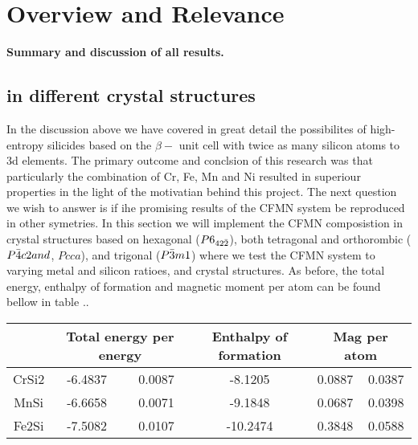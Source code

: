 \chapter{Overview and Relevance}
\label{sec:overview}

\textbf{Summary and discussion of all results.}

\section{ in different crystal structures}

In the discussion above we have covered in great detail the possibilites of high-entropy silicides based on the $\beta-$  unit cell with twice as many silicon atoms to 3d elements. The primary outcome and conclsion of this research was that particularly the combination of Cr, Fe, Mn and Ni resulted in superiour properties in the light of the motivatian behind this project. The next question we wish to answer is if ihe promising results of the CFMN system be reproduced in other symetries. In this section we will implement the CFMN composistion in crystal structures based on hexagonal  ($P6_{42\Bar{2}}$), both tetragonal and orthorombic  ($P\Bar{4}c2 and$, $Pcca$), and trigonal  ($P\Bar{3}m1$) where we test the CFMN system to varying metal and silicon ratioes, and crystal structures. As before, the total energy, enthalpy of formation and magnetic moment per atom can be found bellow in table ..
\begin{table}[h!]
\begin{tabular}{@{}cccccc@{}}
\toprule
            & \multicolumn{2}{c}{Total energy per energy} & Enthalpy of formation & \multicolumn{2}{c}{Mag per atom} \\ \midrule
CrSi2       & -6.4837               & 0.0087              & -8.1205             & 0.0887          & 0.0387         \\
MnSi        & -6.6658               & 0.0071              & -9.1848             & 0.0687          & 0.0398         \\
Fe2Si       & -7.5082               & 0.0107              & -10.2474            & 0.3848          & 0.0588         \\ \bottomrule
\end{tabular}
\end{table}

